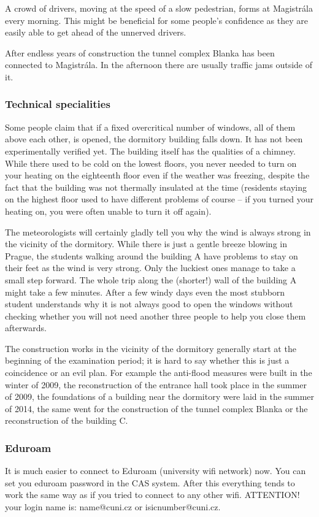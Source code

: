 A crowd of drivers, moving at the speed of a slow pedestrian, forms at
Magistrála every morning.
This might be beneficial for some people's confidence as they are easily able to
get ahead of the unnerved drivers.

After endless years of construction the tunnel complex Blanka has been connected
to Magistrála. In the afternoon there are usually traffic jams outside of it.


\subsubsection{Technical specialities}

Some people claim that if a fixed overcritical number of windows, all of them
above each other, is opened, the dormitory building falls down. It has not been
experimentally verified yet.
The building itself has the qualities of a chimney. While there used to be cold
on the lowest floors, you never needed to turn on your heating on the eighteenth
floor even if the weather was freezing, despite the fact that the building was
not thermally insulated at the time (residents staying on the highest floor used
to have different problems of course -- if you turned your heating on, you were
often unable to turn it off again).

The meteorologists will certainly gladly tell you why the wind is always strong
in the vicinity of the dormitory.
While there is just a gentle breeze blowing in Prague, the students walking
around the building A have problems to stay on their feet as the wind is very
strong. Only the luckiest ones manage to take a small step forward.
The whole trip along the (shorter!) wall of the building A might take a few
minutes. After a few windy days even the most stubborn student understands why
it is not always good to open the windows without checking whether you will not
need another three people to help you close them afterwards.

The construction works in the vicinity of the dormitory generally start at the
beginning of the examination period; it is hard to say whether this is just a
coincidence or an evil plan.
For example the anti-flood measures were built in the winter of 2009, the
reconstruction of the entrance hall took place in the summer of 2009, the
foundations of a building near the dormitory were laid in the summer of 2014,
the same went for the construction of the tunnel complex Blanka or the
reconstruction of the building C.


\subsubsection{Eduroam}
It is much easier to connect to Eduroam (university wifi network) now. You can
set you eduroam password in the CAS system. After this everything tends to work
the same way as if you tried to connect to any other wifi.
ATTENTION! your login name is: name@cuni.cz or isicnumber@cuni.cz.


